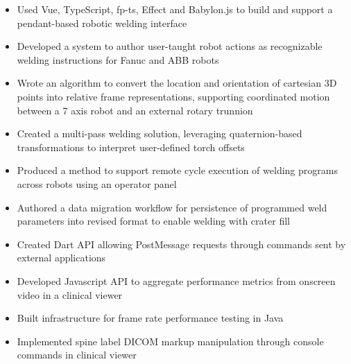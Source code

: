 \documentclass[10pt,a4paper,ragged2e, normalphoto]{altacv}
\begin{document}
\begin{itemize}
\item Used Vue, TypeScript, fp-ts, Effect and Babylon.js to build and support a pendant-based robotic welding interface 
\item Developed a system to author user-taught robot actions as recognizable welding instructions for Fanuc and ABB robots
\item Wrote an algorithm to convert the location and orientation of cartesian 3D points into relative frame representations, supporting coordinated motion between a 7 axis robot and an external rotary trunnion
\item Created a multi-pass welding solution, leveraging quaternion-based transformations to interpret user-defined torch offsets
\item Produced a method to support remote cycle execution of welding programs across robots using an operator panel
\item Authored a data migration workflow for persistence of programmed weld parameters into revised format to enable welding with crater fill

\end{itemize}

\divider

\begin{itemize}
 \item Created Dart API allowing PostMessage requests through commands sent by external applications
 \item Developed Javascript API to aggregate performance metrics from onscreen video in a clinical viewer
 \item Built infrastructure for frame rate performance testing in Java

 \item Implemented spine label DICOM markup manipulation through console commands in clinical viewer
\end{itemize}
\end{document}
